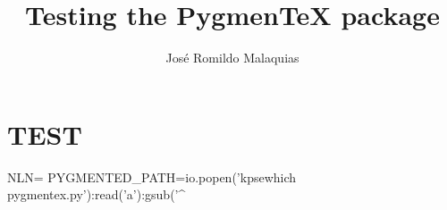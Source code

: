 \documentclass[10pt,a4paper]{article}
\begin{document}
\title{Testing the Pygmen\TeX{} package}
\author{José Romildo Malaquias}
\maketitle

\section{TEST}
\begin{luacode}
NLN={
PYGMENTED_PATH=io.popen('kpsewhich pygmentex.py'):read('a'):gsub('^%
}
\end{luacode}



%
%
%
%
%
%
%
\end{document}
